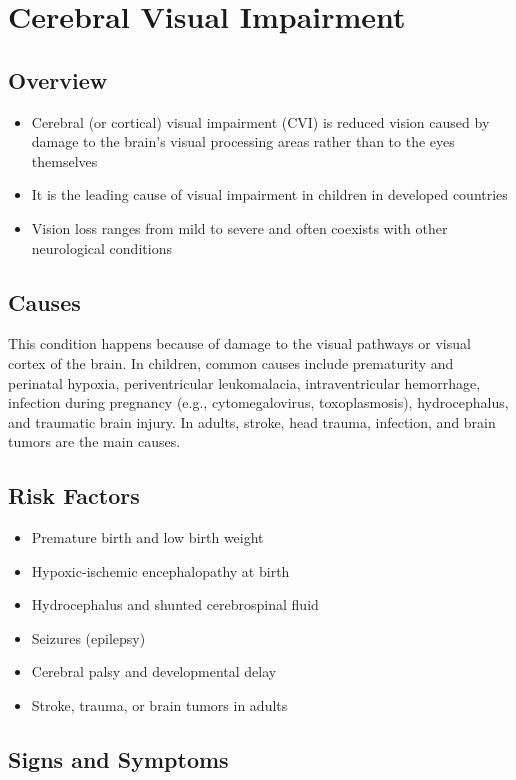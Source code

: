 \chapter{Cerebral Visual Impairment}
\label{sec:Cerebral Visual Impairment}

\section{Overview}
\begin{itemize}[noitemsep]
  \item Cerebral (or cortical) visual impairment (CVI) is reduced vision caused by damage to the brain's visual processing areas rather than to the eyes themselves
  \item It is the leading cause of visual impairment in children in developed countries
  \item Vision loss ranges from mild to severe and often coexists with other neurological conditions
\end{itemize}
\section{Causes}
This condition happens because of damage to the visual pathways or visual cortex of the brain. In children, common causes include prematurity and perinatal hypoxia, periventricular leukomalacia, intraventricular hemorrhage, infection during pregnancy (e.g., cytomegalovirus, toxoplasmosis), hydrocephalus, and traumatic brain injury. In adults, stroke, head trauma, infection, and brain tumors are the main causes.
\section{Risk Factors}
\begin{itemize}[noitemsep]
  \item Premature birth and low birth weight
  \item Hypoxic-ischemic encephalopathy at birth
  \item Hydrocephalus and shunted cerebrospinal fluid
  \item Seizures (epilepsy)
  \item Cerebral palsy and developmental delay
  \item Stroke, trauma, or brain tumors in adults
\end{itemize}
\section{Signs and Symptoms}
